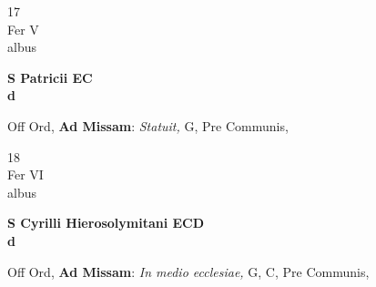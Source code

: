 \documentclass[10pt, openany]{book}
\begin{document}
        \begin{center}
            \begin{minipage}{3.5in}
                \vspace{2em}
                \begin{minipage}{0.5in}
                    {\Huge 17} \\
                    {\normalsize Fer V} \\
                    {\normalsize albus}
                \end{minipage}
                \begin{minipage}{3.0in}
                    \textbf{ \large S Patricii EC \\
                    \textnormal{\normalsize d}} \\ 
                \end{minipage}
                \begin{justify}Off Ord, \textbf{Ad Missam}: \textit{Statuit,} G, Pre Communis,  
                \end{justify}
            \end{minipage}
        \end{center}
    
        \begin{center}
            \begin{minipage}{3.5in}
                \vspace{2em}
                \begin{minipage}{0.5in}
                    {\Huge 18} \\
                    {\normalsize Fer VI} \\
                    {\normalsize albus}
                \end{minipage}
                \begin{minipage}{3.0in}
                    \textbf{ \large S Cyrilli Hierosolymitani ECD \\
                    \textnormal{\normalsize d}} \\ 
                \end{minipage}
                \begin{justify}Off Ord, \textbf{Ad Missam}: \textit{In medio ecclesiae,} G, C, Pre Communis,  
                \end{justify}
            \end{minipage}
        \end{center}
    
\end{document}

